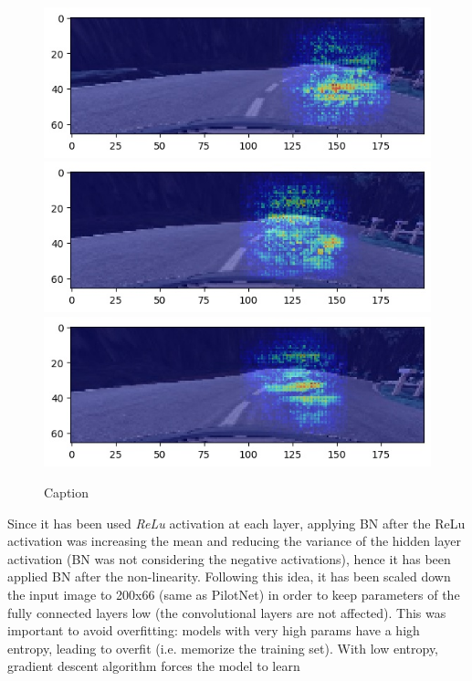 \documentclass[10pt,twocolumn,letterpaper]{article}
\begin{document}
\begin{figure}
    \includegraphics[scale=0.33]{1st-track/yes10-center_2019_04_02_18_07_15_088.jpg} \\
    \includegraphics[scale=0.33]{1st-track/yes10-center_2019_04_02_18_07_15_774.jpg} \\
    \includegraphics[scale=0.33]{1st-track/yes10-center_2019_04_02_18_07_16_461.jpg} \\
    \caption{Caption}
    \label{fig:track1}
\end{figure}

Since it has been used \textit{ReLu} activation at each layer, applying BN after the ReLu activation was increasing the mean and reducing the variance of the hidden layer activation (BN was not considering the negative activations), hence it has been applied BN after the non-linearity. Following this idea, it has been scaled down the input image to 200x66 (same as PilotNet) in order to keep parameters of the fully connected layers low (the convolutional layers are not affected). This was important to avoid overfitting: models with very high params have a high entropy, leading to overfit (i.e. memorize the training set). With low entropy, gradient descent algorithm forces the model to learn
\end{document}
